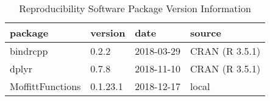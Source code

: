 \documentclass[table]{article}
\begin{document}
\begin{table}[t]

\caption{\label{tab:unnamed-chunk-21}Reproducibility Software Package Version Information}
\centering
\fontsize{8}{10}\selectfont
\begin{tabular}{llll}
\toprule
package & version & date & source\\
\midrule
bindrcpp & 0.2.2 & 2018-03-29 & CRAN (R 3.5.1)\\
dplyr & 0.7.8 & 2018-11-10 & CRAN (R 3.5.1)\\
MoffittFunctions & 0.1.23.1 & 2018-12-17 & local\\
\bottomrule
\end{tabular}
\end{table}
\end{document}
